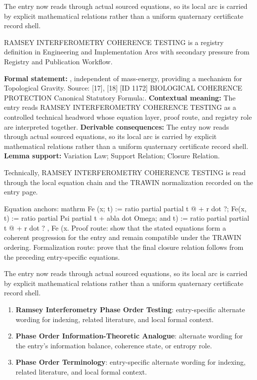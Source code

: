 The entry now reads through actual sourced equations, so its local arc is carried by explicit mathematical relations rather than a uniform quaternary certificate record shell.
\clearpage


\begingroup\small
{}
RAMSEY INTERFEROMETRY COHERENCE TESTING is a registry definition in Engineering and Implementation Arcs with secondary pressure from Registry and Publication Workflow.

\begingroup\footnotesize\setlength{\emergencystretch}{3em}\sloppy
\textbf{Formal statement:} , independent of mass-energy, providing a mechanism for Topological Gravity. Source: [17], [18] [ID 1172] BIOLOGICAL COHERENCE PROTECTION Canonical Statutory Formula:. \textbf{Contextual meaning:} The entry reads RAMSEY INTERFEROMETRY COHERENCE TESTING as a controlled technical headword whose equation layer, proof route, and registry role are interpreted together. \textbf{Derivable consequences:} The entry now reads through actual sourced equations, so its local arc is carried by explicit mathematical relations rather than a uniform quaternary certificate record shell. \textbf{Lemma support:} Variation Law; Support Relation; Closure Relation.\par
\endgroup

Technically, RAMSEY INTERFEROMETRY COHERENCE TESTING is read through the local equation chain and the TRAWIN normalization recorded on the entry page.

Equation anchors: mathrm Fe (x; t) := ratio partial partial t @ + r dot ?; Fe(x, t) := ratio partial Psi partial t + abla dot Omega; and t) := ratio partial partial t @ + r dot ? , Fe (x. Proof route: show that the stated equations form a coherent progression for the entry and remain compatible under the TRAWIN ordering. Formalization route: prove that the final closure relation follows from the preceding entry-specific equations.

The entry now reads through actual sourced equations, so its local arc is carried by explicit mathematical relations rather than a uniform quaternary certificate record shell.
\endgroup

\begin{enumerate}[leftmargin=1.6em,itemsep=6pt,topsep=4pt]
\item \textbf{Ramsey Interferometry Phase Order Testing}: entry-specific alternate wording for indexing, related literature, and local formal context.
\item \textbf{Phase Order Information-Theoretic Analogue}: alternate wording for the entry's information balance, coherence state, or entropy role.
\item \textbf{Phase Order Terminology}: entry-specific alternate wording for indexing, related literature, and local formal context.
\end{enumerate}

